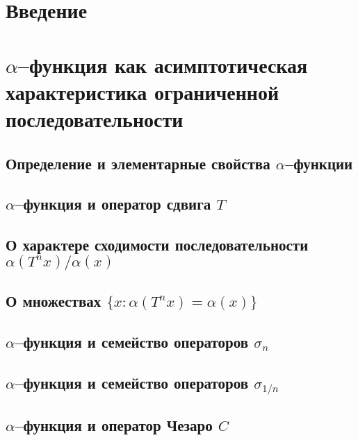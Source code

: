 \documentclass[a4paper,openbib]{report}
\theoremstyle{definition}
\begin{document}

\setcounter{page}{2}
\tableofcontents

\chapter*{Введение}


\chapter{$\alpha$--функция как асимптотическая характеристика ограниченной последовательности}

	\section{Определение и элементарные свойства $\alpha$--функции}
	

	\section{$\alpha$--функция и оператор сдвига $T$}
	

	\section{О характере сходимости последовательности $\alpha(T^n x)/ \alpha(x)$}
	

	\section{О множествах $\{x: \alpha(T^n x) = \alpha(x)\}$}
	

	\section{$\alpha$--функция и семейство операторов $\sigma_n$}
	

	\section{$\alpha$--функция и семейство операторов $\sigma_{1/n}$}
	

	\section{$\alpha$--функция и оператор Чезаро $C$}
	
\end{document}
